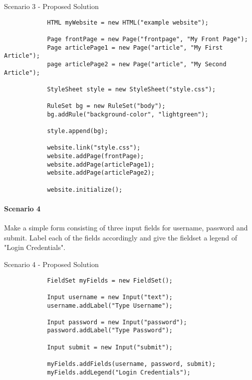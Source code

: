 \documentclass[12pt]{article}
\begin{document}
        \begin{shaded}
            Scenario 3 - Proposed Solution
            \begin{lstlisting}
            HTML myWebsite = new HTML("example website");
            
            Page frontPage = new Page("frontpage", "My Front Page");
            Page articlePage1 = new Page("article", "My First Article");
            page articlePage2 = new Page("article", "My Second Article");

            StyleSheet style = new StyleSheet("style.css");

            RuleSet bg = new RuleSet("body");
            bg.addRule("background-color", "lightgreen");

            style.append(bg);

            website.link("style.css");
            website.addPage(frontPage);
            website.addPage(articlePage1);
            website.addPage(articlePage2);

            website.initialize();
            \end{lstlisting}
        \end{shaded}

        \paragraph{Scenario 4}
        Make a simple form consisting of three input fields for username, password and submit. Label each of the fields accordingly and give the fieldset a legend of "Login Credentials".

        \begin{shaded}
            Scenario 4 - Proposed Solution
            \begin{lstlisting}
            FieldSet myFields = new FieldSet();

            Input username = new Input("text");
            username.addLabel("Type Username");
            
            Input password = new Input("password");
            password.addLabel("Type Password");
            
            Input submit = new Input("submit");

            myFields.addFields(username, password, submit);
            myFields.addLegend("Login Credentials");
            \end{lstlisting}
        \end{shaded}
\end{document}
